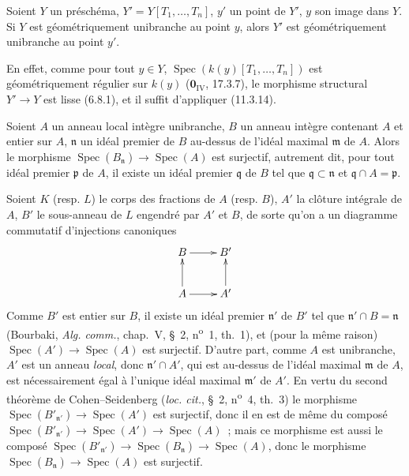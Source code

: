 \begin{lemma}[14.4.1.1]
\label{IV.14.4.1.1-fr}
Soient $Y$ un préschéma, $Y'=Y[T_1,\ldots,T_n]$, $y'$ un point de $Y'$, $y$ son
image dans $Y$. Si $Y$ est géométriquement unibranche au point $y$, alors $Y'$ est
géométriquement unibranche au point $y'$.
\end{lemma}

En effet, comme pour tout $y\in Y$,
$\operatorname{Spec}(k(y)[T_1,\ldots,T_n])$ est géométriquement régulier sur $k(y)$
($\mathbf{0}_{\mathrm{IV}}$, 17.3.7), le morphisme structural $Y'\to Y$ est lisse
(6.8.1), et il suffit d'appliquer (11.3.14).

\begin{lemma}[14.4.1.2]
\label{IV.14.4.1.2-fr}
Soient $A$ un anneau local intègre unibranche, $B$ un anneau intègre contenant $A$
et entier sur $A$, $\mathfrak n$ un idéal premier de $B$ au-dessus de l'idéal
maximal $\mathfrak m$ de $A$. Alors le morphisme
$\operatorname{Spec}(B_{\mathfrak n})\to\operatorname{Spec}(A)$ est surjectif,
autrement dit, pour tout idéal premier $\mathfrak p$ de $A$, il existe un idéal
premier $\mathfrak q$ de $B$ tel que $\mathfrak q\subset\mathfrak n$ et
$\mathfrak q\cap A=\mathfrak p$.
\end{lemma}

Soient $K$ (resp. $L$) le corps des fractions de $A$ (resp. $B$), $A'$ la clôture
intégrale de $A$, $B'$ le sous-anneau de $L$ engendré par $A'$ et $B$, de sorte
qu'on a un diagramme commutatif d'injections canoniques
\[
  \xymatrix{
    B \ar[r] & B' \\
    A \ar[u] \ar[r] & A' \ar[u]
  }
\]
Comme $B'$ est entier sur $B$, il existe un idéal premier $\mathfrak n'$ de $B'$
tel que $\mathfrak n'\cap B=\mathfrak n$ (Bourbaki, \emph{Alg. comm.}, chap.~V,
\S~2, n\textsuperscript{o}~1, th.~1), et (pour la même raison)
$\operatorname{Spec}(A')\to\operatorname{Spec}(A)$ est surjectif. D'autre part,
comme $A$ est unibranche, $A'$ est un anneau \emph{local}, donc
$\mathfrak n'\cap A'$, qui est au-dessus de l'idéal maximal $\mathfrak m$ de $A$,
est nécessairement égal à l'unique idéal maximal $\mathfrak m'$ de $A'$. En vertu
du second théorème de Cohen--Seidenberg (\emph{loc. cit.}, \S~2,
n\textsuperscript{o}~4, th.~3) le morphisme
$\operatorname{Spec}(B'_{\mathfrak n'})\to\operatorname{Spec}(A')$ est surjectif,
donc il en est de même du composé
$\operatorname{Spec}(B'_{\mathfrak n'})\to\operatorname{Spec}(A')\to
\operatorname{Spec}(A)$~; mais ce morphisme est aussi le composé
$\operatorname{Spec}(B'_{\mathfrak n'})\to\operatorname{Spec}(B_{\mathfrak n})
\to\operatorname{Spec}(A)$, donc le morphisme
$\operatorname{Spec}(B_{\mathfrak n})\to\operatorname{Spec}(A)$ est surjectif.

